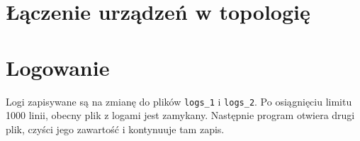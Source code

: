 \documentclass[11pt]{article}
\begin{document}
\section{Łączenie urządzeń w topologię}

\section{Logowanie}

Logi zapisywane są na zmianę do plików \verb|logs_1| i \verb|logs_2|. Po osiągnięciu limitu 1000 linii, obecny plik z logami jest zamykany. Następnie program otwiera drugi plik, czyści jego zawartość i kontynuuje tam zapis. 

\end{document}
